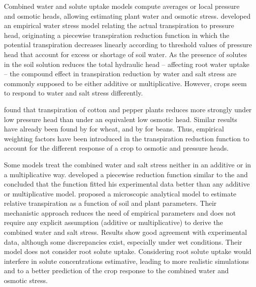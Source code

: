 Combined water and solute uptake models compute averages or local pressure and osmotic heads, allowing estimating plant water and osmotic stress. 
\citeonline[feddes78] developed an empirical water stress model relating the actual transpiration to pressure head, originating a piecewise transpiration reduction function in which the potential transpiration decreases linearly according to threshold values of pressure head that account for excess or shortage of soil water.
As the presence of solutes in the soil solution reduces the total hydraulic head -- affecting root water uptake -- the compound effect in transpiration reduction by water and salt stress are commonly supposed to be either additive 
or multiplicative.
However, crops seem to respond to water and salt stress differently. 

\citeonline[shalhevet] found that transpiration of cotton and pepper plants reduces more strongly under low pressure head than under an equivalent low osmotic head. 
Similar results have already been found by \citeonline[sepaskhah] for wheat, and by \citeonline[parra] for beans.
Thus, empirical weighting factors have been introduced in the transpiration reduction function to account for the different response of a crop to osmotic and pressure heads.

Some models treat the combined water and salt stress neither in an additive or in a multiplicative way. \citeonline[homaee] developed a piecewise reduction function similar to the \citeonline[feddes78] and concluded that the function fitted his experimental data better than any additive or multiplicative model.
\citeonline[liersolute] proposed a microscopic analytical model to estimate relative transpiration as a function of soil and plant parameters. 
Their mechanistic approach reduces the need of empirical parameters and does not require any explicit assumption (additive or multiplicative) to derive the combined water and salt stress. 
Results show good agreement with experimental data, although some discrepancies exist, especially under wet conditions. 
Their model does not consider root solute uptake.
Considering root solute uptake would interfere in solute concentrations estimative, leading to more realistic simulations and to a better prediction of the crop response to the combined water and osmotic stress.



